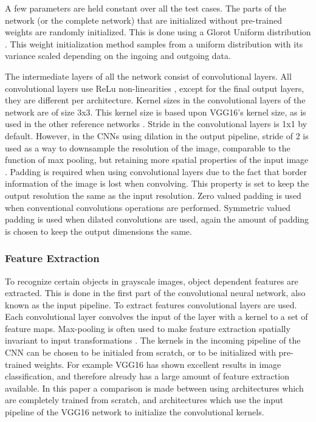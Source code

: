 A few parameters are held constant over all the test cases. The parts of the network (or the complete network) that are initialized without pre-trained weights are randomly initialized. This is done using a Glorot Uniform distribution \cite{Glorot}. This weight initialization method samples from a uniform distribution with its variance scaled depending on the ingoing and outgoing data. 

The intermediate layers of all the network consist of convolutional layers. All convolutional layers use ReLu non-linearities \cite{nair2010rectified}, except for the final output layers, they are different per architecture. 
Kernel sizes in the convolutional layers of the network are of size 3x3. This kernel size is based upon VGG16's \cite{Simonyan} kernel size, as is used in the other reference networks \cite{Dahl}\cite{Zhang} \cite{ioffe2015batch}.
Stride in the convolutional layers is 1x1 by default. However, in the CNNs using dilation in the output pipeline, stride of 2 is used as a way to downsample the resolution of the image, comparable to the function of max pooling, but retaining more spatial properties of the input image \cite{yu2015multi}. Padding is required when using convolutional layers due to the fact that border information of the image is lost when convolving. This property is set to keep the output resolution the same as the input resolution. Zero valued padding is used when conventional convolutions operations are performed. Symmetric valued padding is used when dilated convolutions are used, again the amount of padding is chosen to keep the output dimensions the same.\\


\subsubsection{Feature Extraction}
To recognize certain objects in grayscale images, object dependent features are extracted. This is done in the first part of the convolutional neural network, also known as the input pipeline. To extract features convolutional layers are used. Each convolutional layer convolves the input of the layer with a kernel to a set of feature maps. Max-pooling is often used to make feature extraction spatially invariant to input transformations \cite{Simonyan}. The kernels in the incoming pipeline of the CNN can be chosen to be initialed from scratch, or to be initialized with pre-trained weights. For example VGG16 \cite{Simonyan} has shown excellent results in image classification, and therefore already has a large amount of feature extraction available. In this paper a comparison is made between using architectures which are completely trained from scratch, and architectures which use the input pipeline of the VGG16 network to initialize the convolutional kernels.\\

